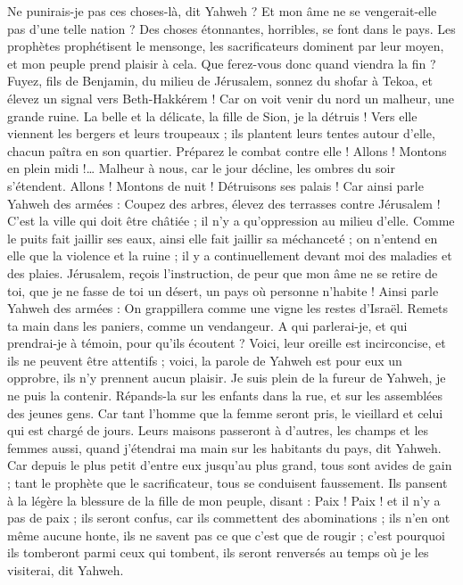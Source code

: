 \begin{multicols}{2}
Ne punirais-je pas ces choses-là, dit Yahweh ? Et mon âme ne se vengerait-elle pas d'une telle nation ?
Des choses étonnantes, horribles, se font dans le pays.
Les prophètes prophétisent le mensonge, les sacrificateurs dominent par leur moyen, et mon peuple prend plaisir à cela. Que ferez-vous donc quand viendra la fin ?
\VerseOne{}Fuyez, fils de Benjamin, du milieu de Jérusalem, sonnez du shofar à Tekoa, et élevez un signal vers Beth-Hakkérem ! Car on voit venir du nord un malheur, une grande ruine.
La belle et la délicate, la fille de Sion, je la détruis !
Vers elle viennent les bergers et leurs troupeaux ; ils plantent leurs tentes autour d'elle, chacun paîtra en son quartier.
Préparez le combat contre elle ! Allons ! Montons en plein midi !… Malheur à nous, car le jour décline, les ombres du soir s'étendent.
Allons ! Montons de nuit ! Détruisons ses palais !
Car ainsi parle Yahweh des armées : Coupez des arbres, élevez des terrasses contre Jérusalem ! C'est la ville qui doit être châtiée ; il n’y a qu’oppression au milieu d’elle.
Comme le puits fait jaillir ses eaux, ainsi elle fait jaillir sa méchanceté ; on n'entend en elle que la violence et la ruine ; il y a continuellement devant moi des maladies et des plaies.
Jérusalem, reçois l’instruction, de peur que mon âme ne se retire de toi, que je ne fasse de toi un désert, un pays où personne n’habite !
Ainsi parle Yahweh des armées : On grappillera comme une vigne les restes d'Israël. Remets ta main dans les paniers, comme un vendangeur.
A qui parlerai-je, et qui prendrai-je à témoin, pour qu'ils écoutent ? Voici, leur oreille est incirconcise, et ils ne peuvent être attentifs ; voici, la parole de Yahweh est pour eux un opprobre, ils n'y prennent aucun plaisir.
Je suis plein de la fureur de Yahweh, je ne puis la contenir. Répands-la sur les enfants dans la rue, et sur les assemblées des jeunes gens. Car tant l’homme que la femme seront pris, le vieillard et celui qui est chargé de jours.
Leurs maisons passeront à d’autres, les champs et les femmes aussi, quand j'étendrai ma main sur les habitants du pays, dit Yahweh.
Car depuis le plus petit d'entre eux jusqu’au plus grand, tous sont avides de gain ; tant le prophète que le sacrificateur, tous se conduisent faussement.
Ils pansent à la légère la blessure de la fille de mon peuple, disant : Paix ! Paix ! et il n'y a pas de paix ;
ils seront confus, car ils commettent des abominations ; ils n'en ont même aucune honte, ils ne savent pas ce que c'est que de rougir ; c'est pourquoi ils tomberont parmi ceux qui tombent, ils seront renversés au temps où je les visiterai, dit Yahweh.

\end{multicols}

